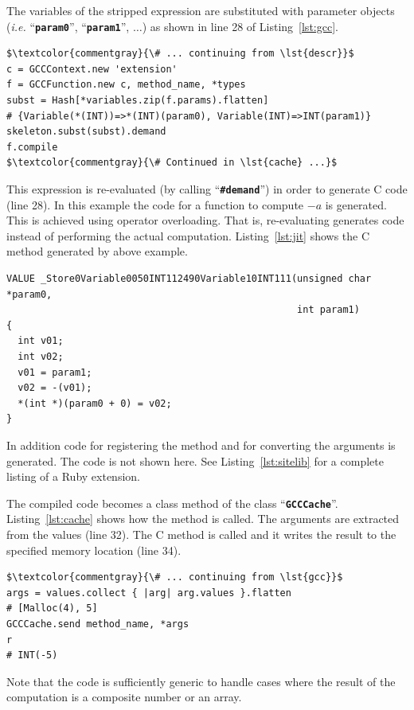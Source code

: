 \documentclass[12pt,a4paper,oneside,openright]{book}
\newcommand{\ie}{\emph{i.e.} }
\newcommand{\Ie}{That is, }
\newcommand{\lst}[1]{Listing~\ref{lst:#1}}
\newcommand{\code}[1]{``\texttt{\textbf{\textcolor{codegray}{\small{#1}}}}''}
\begin{document}
\begin{CJK}{UTF8}{}
The variables of the stripped expression are substituted with parameter objects (\ie \code{param0}, \code{param1}, $\ldots$) as shown in line 28 of \lst{gcc}.
\lstset{language=Ruby,frame=single,numbers=left}
\begin{lstlisting}[float,caption={Using special objects to generate C code},escapechar=\$,label=lst:gcc,name=gcc]
$\textcolor{commentgray}{\# ... continuing from \lst{descr}}$
c = GCCContext.new 'extension'
f = GCCFunction.new c, method_name, *types
subst = Hash[*variables.zip(f.params).flatten]
# {Variable(*(INT))=>*(INT)(param0), Variable(INT)=>INT(param1)}
skeleton.subst(subst).demand
f.compile
$\textcolor{commentgray}{\# Continued in \lst{cache} ...}$
\end{lstlisting}
This expression is re-evaluated (by calling \code{\#demand}) in order to generate C code (line 28). In this example the code for a function to compute $-a$ is generated. This is achieved using operator overloading. \Ie re-evaluating generates code instead of performing the actual computation. \lst{jit} shows the C method generated by above example.
\lstset{language=C,frame=single,numbers=none}
\begin{lstlisting}[float,caption={The resulting C code to \lst{gcc}},label=lst:jit]
VALUE _Store0Variable0050INT112490Variable10INT111(unsigned char *param0,
                                                   int param1)
{
  int v01;
  int v02;
  v01 = param1;
  v02 = -(v01);
  *(int *)(param0 + 0) = v02;
}
\end{lstlisting}
In addition code for registering the method and for converting the arguments is generated. The code is not shown here. See \lst{sitelib} for a complete listing of a Ruby extension.

The compiled code becomes a class method of the class \code{GCCCache}. \lst{cache} shows how the method is called. The arguments are extracted from the values (line 32). The C method is called and it writes the result to the specified memory location (line 34).
\lstset{language=Ruby,frame=single,numbers=left}
\begin{lstlisting}[float,caption={Calling the compiled method},escapechar=\$,label=lst:cache,name=gcc]
$\textcolor{commentgray}{\# ... continuing from \lst{gcc}}$
args = values.collect { |arg| arg.values }.flatten
# [Malloc(4), 5]
GCCCache.send method_name, *args
r
# INT(-5)
\end{lstlisting}
Note that the code is sufficiently generic to handle cases where the result of the computation is a composite number or an array.


\end{CJK}
\end{document}
